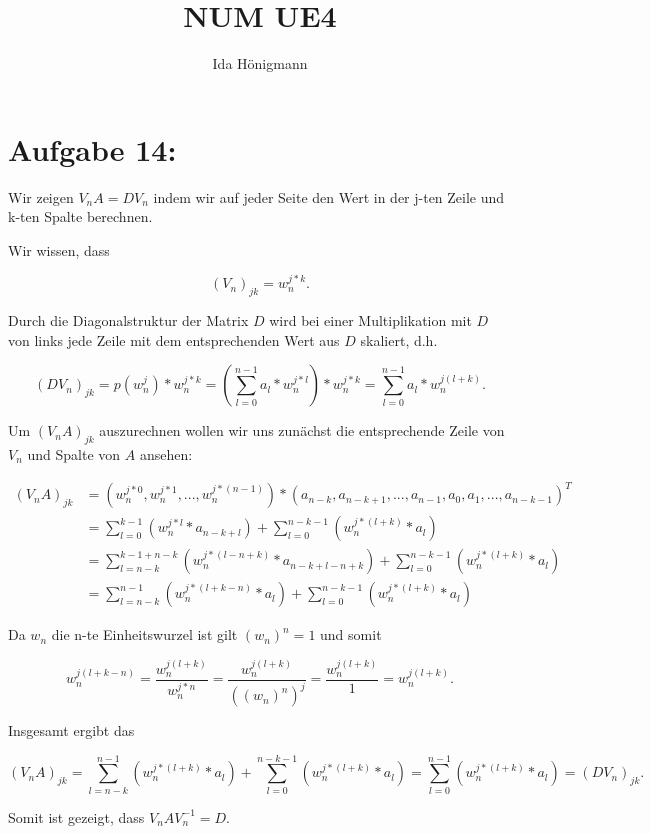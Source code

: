 \documentclass[]{article}
\title{NUM UE4}
\author{Ida Hönigmann}
\begin{document}
\maketitle

\section{Aufgabe 14:}
Wir zeigen $V_nA = DV_n$ indem wir auf jeder Seite den Wert in der j-ten Zeile und k-ten Spalte berechnen.

Wir wissen, dass

\[
(V_n)_{jk} = w_n^{j*k}.
\]

Durch die Diagonalstruktur der Matrix $D$ wird bei einer Multiplikation mit $D$ von links jede Zeile mit dem entsprechenden Wert aus $D$ skaliert, d.h.

\[
(DV_n)_{jk} = p(w_n^j)*w_n^{j*k} = (\sum_{l=0}^{n-1}a_l*w_n^{j*l}) * w_n^{j*k} = \sum_{l=0}^{n-1}a_l*w_n^{j(l+k)}.
\]

Um $(V_nA)_{jk}$ auszurechnen wollen wir uns zunächst die entsprechende Zeile von $V_n$ und Spalte von $A$ ansehen:

\begin{align*}
(V_nA)_{jk} &= (w_n^{j*0}, w_n^{j*1}, ..., w_n^{j*(n-1)}) * (a_{n-k}, a_{n-k+1}, ..., a_{n-1}, a_0, a_1, ..., a_{n-k-1})^T \\
 &= \sum_{l=0}^{k-1} (w_n^{j*l} * a_{n-k+l}) + \sum_{l=0}^{n-k-1} (w_n^{j*(l+k)}*a_l) \\
 &= \sum_{l=n-k}^{k-1+n-k} (w_n^{j*(l-n+k)} * a_{n-k+l-n+k}) + \sum_{l=0}^{n-k-1} (w_n^{j*(l+k)}*a_l) \\
  &= \sum_{l=n-k}^{n-1} (w_n^{j*(l+k-n)} * a_{l}) + \sum_{l=0}^{n-k-1} (w_n^{j*(l+k)}*a_l)
\end{align*}

Da $w_n$ die n-te Einheitswurzel ist gilt $(w_n)^n = 1$ und somit

\[
w_n^{j(l+k-n)} = \frac{w_n^{j(l+k)}}{w_n^{j*n}} = \frac{w_n^{j(l+k)}}{((w_n)^{n})^{j}} = \frac{w_n^{j(l+k)}}{1} = w_n^{j(l+k)}.
\]

Insgesamt ergibt das

\[
(V_nA)_{jk} = \sum_{l=n-k}^{n-1} (w_n^{j*(l+k)} * a_{l}) + \sum_{l=0}^{n-k-1} (w_n^{j*(l+k)}*a_l) = \sum_{l=0}^{n-1} (w_n^{j*(l+k)} * a_{l}) = (DV_n)_{jk}.
\]

Somit ist gezeigt, dass $V_nAV_n^{-1} = D$.
\end{document}
